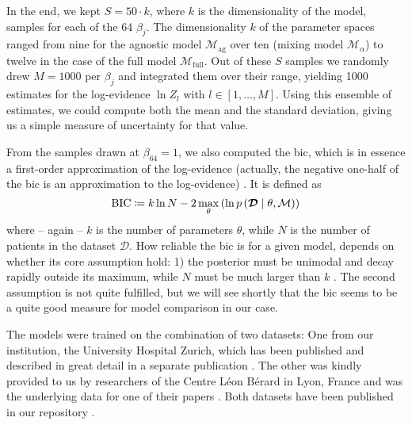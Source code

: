 \documentclass[\relativeRoot/main.tex]{subfiles}
\begin{document}
In the end, we kept $S = 50 \cdot k$, where $k$ is the dimensionality of the model, samples for each of the 64 $\beta_j$. The dimensionality $k$ of the parameter spaces ranged from nine for the agnostic model $\mathcal{M}_\text{ag}$ over ten (mixing model $\mathcal{M}_\alpha$) to twelve in the case of the full model $\mathcal{M}_\text{full}$. Out of these $S$ samples we randomly drew $M = 1000$ per $\beta_j$ and integrated them over their range, yielding 1000 estimates for the log-evidence $\ln{Z}_l$ with $l \in [1, \ldots, M]$. Using this ensemble of estimates, we could compute both the mean and the standard deviation, giving us a simple measure of uncertainty for that value.

From the samples drawn at $\beta_{64} = 1$, we also computed the \gls{bic}, which is in essence a first-order approximation of the log-evidence (actually, the negative one-half of the \gls{bic} is an approximation to the log-evidence) \cite{schwarz_estimating_1978}. It is defined as
%
\begin{equation}
    \text{BIC} \coloneqq k \ln{N} - 2 \max_\theta{ \left( \ln{ p \left( \boldsymbol{\mathcal{D}} \mid \theta, \mathcal{M} \right) } \right)}
\end{equation}
%
where -- again -- $k$ is the number of parameters $\theta$, while $N$ is the number of patients in the dataset $\boldsymbol{\mathcal{D}}$. How reliable the \gls{bic} is for a given model, depends on whether its core assumption hold: 1) the posterior must be unimodal and decay rapidly outside its maximum, while $N$ must be much larger than $k$ \cite{bhat_derivation_2010}. The second assumption is not quite fulfilled, but we will see shortly that the \gls{bic} seems to be a quite good measure for model comparison in our case.

The models were trained on the combination of two datasets: One from our institution, the University Hospital Zurich, which has been published and described in great detail in a separate publication \cite{ludwig_dataset_2021}. The other was kindly provided to us by researchers of the Centre Léon Bérard in Lyon, France and was the underlying data for one of their papers \cite{bauwens_prevalence_2021}. Both datasets have been published in our repository .
\end{document}

